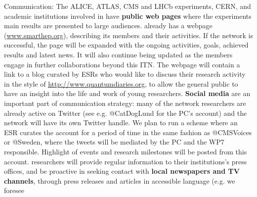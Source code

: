 \color{blue}Communication: \color{black} 
The ALICE, ATLAS, CMS and LHCb experiments, CERN, and academic institutions
involved in \acronym have
\textbf{public web pages} where the experiments
main results are presented to large audiences. 
\acronym already has a webpage (\url{www.smarthep.org}), 
describing its members and their activities. If the network is successful,
the page will be  expanded with the ongoing activities, goals, achieved results and latest
news. It will also continue being updated as the members engage in further collaborations
beyond this ITN. The webpage will contain a link to a blog  
curated by ESRs who would like to 
discuss their research activity in the style of
\href{http://www.quantumdiaries.org}{http://www.quantumdiaries.org}, 
to allow the general public to have an insight into the life and work of young
researchers. 
\textbf{Social media} are an important part of \acronym communication strategy:
many of the network researchers are already active on Twitter (see e.g.
@CatDogLund for the PC's account) and the network will
have its own Twitter handle. We plan to run a scheme where an ESR curates the account
for a period of time in the same fashion
as @CMSVoices or @Sweden, where the tweets will be
mediated by the PC and the WP7 responsible. Highlight of \acronym
events and research milestones will be posted from this account. 
\acronym researchers will provide regular information to their
institutions's press offices, and be proactive in seeking contact with 
\textbf{local newspapers and TV channels}, through press releases and articles
in accessible language (e.g. we foresee

